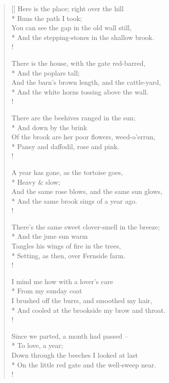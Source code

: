 \documentclass[MAIN]{subfiles}
\begin{document}
\settowidth{\versewidth}{Here is the place; right over the hill}
\begin{verse}[\versewidth]
Here is the place; right over the hill\\*
\vin Runs the path I took;\\
You can see the gap in the old wall still,\\*
\vin And the stepping-stones in the shallow brook.\\!

There is the house, with the gate red-barred,\\*
\vin And the poplars tall;\\
And the barn's brown length, and the cattle-yard,\\*
\vin And the white horns tossing above the wall.\\!

There are the beehives ranged in the sun;\\*
\vin And down by the brink\\
Of the brook are her poor flowers, weed-o'errun,\\*
\vin Pansy and daffodil, rose and pink.\\!

A year has gone, as the tortoise goes,\\*
\vin Heavy \& slow;\\
And the same rose blows, and the same sun glows,\\*
\vin And the same brook sings of a year ago.\\!

There's the same sweet clover-smell in the breeze;\\*
\vin And the june sun warm\\
Tangles his wings of fire in the trees,\\*
\vin Setting, as then, over {\sc Fernside} farm.\\!

I mind me how with a lover's care\\*
\vin From my sunday coat\\
I brushed off the burrs, and smoothed my hair,\\*
\vin And cooled at the brookside my brow and throat.\\!

Since we parted, a month had passed --\\*
\vin To love, a year;\\
Down through the beeches I looked at last\\*
\vin On the little red gate and the well-sweep near.\\!


\end{verse}
\end{document}
